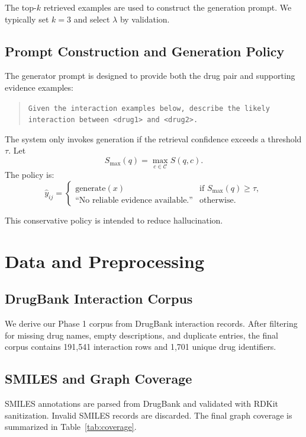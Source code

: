 \documentclass[conference]{IEEEtran}
\begin{document}
The top-$k$ retrieved examples are used to construct the generation prompt. We typically set $k=3$ and select $\lambda$ by validation.

\subsection{Prompt Construction and Generation Policy}
The generator prompt is designed to provide both the drug pair and supporting evidence examples:
\begin{quote}
\texttt{Given the interaction examples below, describe the likely interaction between <drug1> and <drug2>.}
\end{quote}

The system only invokes generation if the retrieval confidence exceeds a threshold $\tau$. Let
\begin{equation}
    S_{\max}(q) = \max_{c \in \mathcal{C}} S(q,c).
\end{equation}
The policy is:
\begin{equation}
    \hat{y}_{ij} = \begin{cases}
      \text{generate}(x) & \text{if } S_{\max}(q) \ge \tau, \\
      \text{``No reliable evidence available.''} & \text{otherwise.}
    \end{cases}
\end{equation}

This conservative policy is intended to reduce hallucination.

\section{Data and Preprocessing}
\subsection{DrugBank Interaction Corpus}
We derive our Phase 1 corpus from DrugBank interaction records. After filtering for missing drug names, empty descriptions, and duplicate entries, the final corpus contains 191,541 interaction rows and 1,701 unique drug identifiers.

\subsection{SMILES and Graph Coverage}
SMILES annotations are parsed from DrugBank and validated with RDKit sanitization. Invalid SMILES records are discarded. The final graph coverage is summarized in Table~\ref{tab:coverage}.
\end{document}
